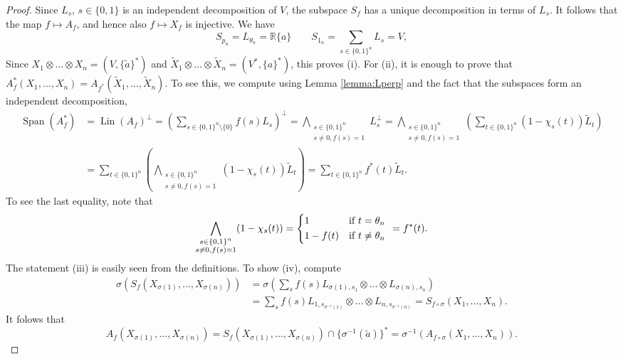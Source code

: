 \documentclass[12pt]{article}
\theoremstyle{definition}
\theoremstyle{remark}
\def\lin{\operatorname{Lin}}
\def\Span{\operatorname{Span}}
\begin{document}
\begin{proof} Since  $L_s$, $s\in \{0,1\}$ is an independent decomposition of $V$, the
subspace $S_f$ has a unique decomposition in terms of $L_s$. It follows 
 that the map $f\mapsto A_f$, and hence also $f\mapsto X_f$ is injective. 
We have 
\[
S_{p_n}=L_{\theta_n}=\mathbb R\{a\}\qquad S_{1_n}=\sum_{s\in \{0,1\}^n}L_s=V,
\]
Since $X_1\otimes\dots\otimes X_n=(V,\{\tilde a\}^*)$ and $\tilde X_1\otimes \dots\otimes
\tilde X_n=(V^*,\{a\}^*)$, this proves (i). For (ii), it is enough to prove that 
$A^*_f(X_1,\dots,X_n)=A_{f^*}(\tilde X_1,\dots, \tilde X_n)$. To see this, we compute
using Lemma \ref{lemma:Lperp} and the fact that the subspaces form an independent
decomposition,
\begin{align*}
\Span( A^*_f)&=\lin(A_f)^\perp=\left(\sum_{s\in\{0,1\}^n\setminus\{0\}}
f(s)L_s\right)^\perp=
\bigwedge_{\substack{s\in\{0,1\}^n\\ s\ne 0, f(s)=1}}L_s^\perp=
\bigwedge_{\substack{s\in\{0,1\}^n\\ s\ne 0,
f(s)=1}}\left(\sum_{t\in\{0,1\}^n}(1-{\chi}_s(t))\tilde L_t\right)\\
&=\sum_{t\in\{0,1\}^n} \left(\bigwedge_{\substack{s\in \{0,1\}^n\\ s\ne 0, f(s)=1}}
(1-{\chi}_s(t))\tilde L_t\right)=\sum_{t\in \{0,1\}^n} f^*(t) \tilde L_t.
\end{align*}
To see the last equality, note that
\[
\bigwedge_{\substack{s\in \{0,1\}^n\\ s\ne 0, f(s)=1}}
(1-{\chi}_s(t))=\begin{dcases} 1 & \text{if } t=\theta_n\\ 1-f(t) & \text{if } t\ne \theta_n
\end{dcases} \ = f^*(t).
\]
The statement (iii) is easily seen from the definitions. To show (iv), compute
\begin{align*}
\sigma(S_f(X_{\sigma(1)},\dots,X_{\sigma(n)}))&=\sigma(\sum_{s} f(s)L_{\sigma(1),s_1}\otimes\dots \otimes
L_{\sigma(n),s_n})\\
&=\sum_s f(s) L_{1,s_{\sigma^{-1}(1)}}\otimes\dots\otimes
L_{n,s_{\sigma^{-1}(n)}}=S_{f\circ\sigma}(X_1,\dots,X_n).
\end{align*}
It folows that
\[
A_f(X_{\sigma(1)},\dots, X_{\sigma(n)})=S_f(X_{\sigma(1)},\dots, X_{\sigma(n)})\cap
\{\sigma^{-1}(\tilde a)\}^*=
\sigma^{-1}(A_{f\circ\sigma}(X_1,\dots,X_n)).
\]




\end{proof}
\end{document}
